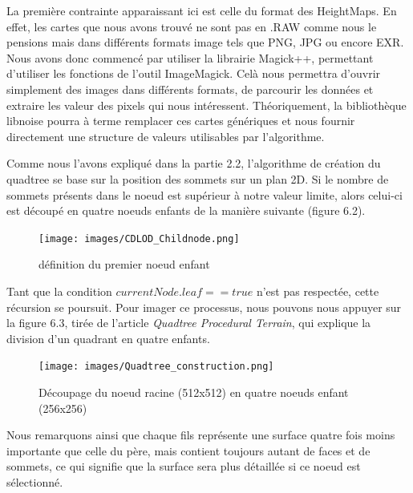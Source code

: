 \documentclass[12pt]{report}
\begin{document}
\newpage

La première contrainte apparaissant ici est celle du format des HeightMaps. En effet, les cartes que nous avons trouvé ne sont pas en .RAW comme nous le pensions mais dans différents formats image tels que PNG, JPG ou encore EXR. Nous avons donc commencé par utiliser la librairie Magick++, permettant d'utiliser les fonctions de l'outil ImageMagick. Celà nous permettra d'ouvrir simplement des images dans différents formats, de parcourir les données et extraire les valeur des pixels qui nous intéressent. Théoriquement, la bibliothèque libnoise pourra à terme remplacer ces cartes génériques et nous fournir directement une structure de valeurs utilisables par l'algorithme.

Comme nous l'avons expliqué dans la partie 2.2, l'algorithme de création du quadtree se base sur la position des sommets sur un plan 2D. Si le nombre de sommets présents dans le noeud est supérieur à notre valeur limite, alors celui-ci est découpé en quatre noeuds enfants de la manière suivante (figure 6.2).

\begin{figure}[h]
    \centering
    \texttt{[image: images/CDLOD\_Childnode.png]}
    \caption{définition du premier noeud enfant}
\end{figure}

Tant que la condition $currentNode.leaf == true$ n'est pas respectée, cette récursion se poursuit. Pour imager ce processus, nous pouvons nous appuyer sur la figure 6.3, tirée de l'article \textit{Quadtree Procedural Terrain}\cite{ECh'ng}, qui explique la division d'un quadrant en quatre enfants.

\newpage

\begin{figure}[h]
    \begin{center}
    \texttt{[image: images/Quadtree\_construction.png]}
    \caption{Découpage du noeud racine (512x512) en quatre noeuds enfant (256x256)}
    \end{center}
\end{figure}

\vspace{0.3cm}

Nous remarquons ainsi que chaque fils représente une surface quatre fois moins importante que celle du père, mais contient toujours autant de faces et de sommets, ce qui signifie que la surface sera plus détaillée si ce noeud est sélectionné.
\end{document}
